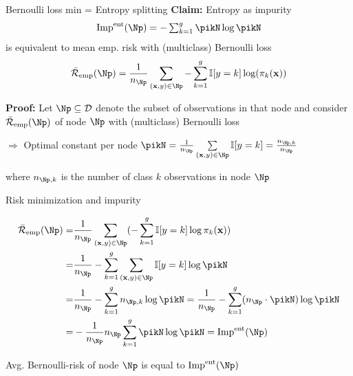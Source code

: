 \documentclass[11pt,compress,t,notes=noshow, xcolor=table]{beamer}
\begin{document}
\begin{frame}{Bernoulli loss min = Entropy splitting}
\textbf{Claim:} Entropy as impurity
$$\text{Imp}^{\text{ent}}(\Np) = -\textstyle\sum_{k = 1}^g \pikN \log \pikN$$
is equivalent to mean emp. risk with (multiclass) Bernoulli loss
$$\riskeb(\Np) = %
\frac{1}{n_\Np} \sum_{\xy \in \Np} -\sum_{k = 1}^g \I [y=k] \log (\pi_k(\xv))$$  %


\textbf{Proof:} %
Let $\Np \subseteq \D$ denote the subset of observations in that node and consider $\riskeb(\Np)$ of node $\Np$ with (multiclass) Bernoulli loss  

\vfill

$\Rightarrow$ Optimal constant per node $\pikN = \frac{1}{n_{\Np}} \sum\limits_{(\xv,y) \in \Np} \I [y=k] = \frac{n_{\Np,k}}{n_{\Np }}$\\

\vfill

where $n_{\Np,k}$ is the number of class $k$ observations in node $\Np$ \\


\end{frame}


\begin{framev}[fs=small]{Risk minimization and impurity}

\begin{align*}
\riskeb(\Np) =& \frac{1}{n_{\Np}} \sum_{\xy \in \Np} (- \sum_{k = 1}^g \I [y=k] \log \pi_k(\xv) ) \\
=& \frac{1}{n_{\Np}} -\sum_{k = 1}^g \sum_{\xy \in \Np} \I [y=k]\log \pikN \\
=& \frac{1}{n_{\Np}} -\sum_{k = 1}^g n_{\Np,k} \log \pikN =\frac{1}{n_{\Np}} -\sum_{k = 1}^g (n_\Np \cdot \pikN) \log \pikN  %
\\
=& - \frac{1}{n_{\Np}} n_{\Np} \sum_{k = 1}^g \pikN \log \pikN = \text{Imp}^{\text{ent}}(\Np)
\end{align*} 

Avg. Bernoulli-risk of node $\Np$ is equal to $\text{Imp}^{\text{ent}}(\Np)$

\end{framev}
\end{document}
